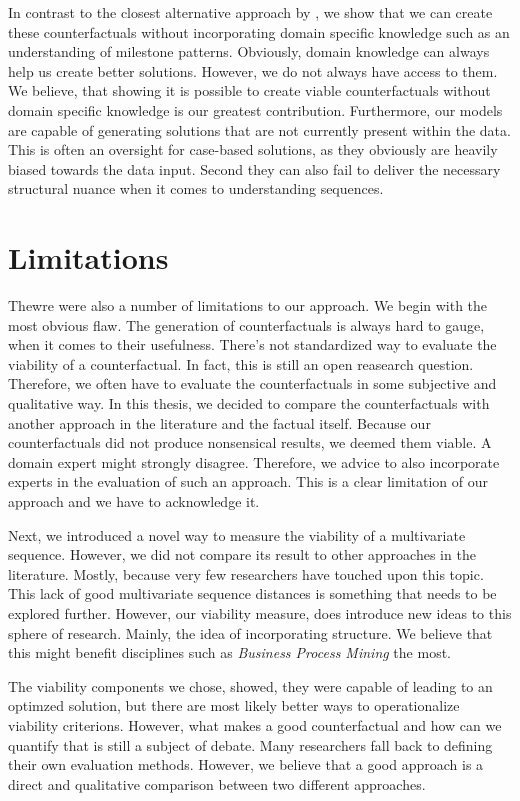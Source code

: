 \documentclass[12pt,a4paper]{report}
\begin{document}
In contrast to the closest alternative approach by \citeauthor{hsieh_DiCE4ELInterpretingProcess_2021}, we show that we can create these counterfactuals without incorporating domain specific knowledge such as an understanding of milestone patterns. Obviously, domain knowledge can always help us create better solutions. However, we do not always have access to them. We believe, that showing it is possible to create viable counterfactuals without domain specific knowledge is our greatest contribution. Furthermore, our models are capable of generating solutions that are not currently present within the data. This is often an oversight for case-based solutions, as they obviously are heavily biased towards the data input. Second they can also fail to deliver the necessary structural nuance when it comes to understanding sequences.

\section{Limitations}
Thewre were also a number of limitations to our approach. We begin with the most obvious flaw. The generation of counterfactuals is always hard to gauge, when it comes to their usefulness. There's not standardized way to evaluate the viability of a counterfactual. In fact, this is still an open reasearch question. Therefore, we often have to evaluate the counterfactuals in some subjective and qualitative way. In this thesis, we decided to compare the counterfactuals with another approach in the literature and the factual itself. Because our counterfactuals did not produce nonsensical results, we deemed them viable. A domain expert might strongly disagree. Therefore, we advice to also incorporate experts in the evaluation of such an approach. This is a clear limitation of our approach and we have to acknowledge it. 

Next, we introduced a novel way to measure the viability of a multivariate sequence. However, we did not compare its result to other approaches in the literature. Mostly, because very few researchers have touched upon this topic. This lack of good multivariate sequence distances is something that needs to be explored further. However, our viability measure, does introduce new ideas to this sphere of research. Mainly, the idea of incorporating structure. We believe that this might benefit disciplines such as \emph{Business Process Mining} the most. 

The viability components we chose, showed, they were capable of leading to an optimzed solution, but there are most likely better ways to operationalize viability criterions. However, what makes a good counterfactual and how can we quantify that is still a subject of debate. Many researchers fall back to defining their own evaluation methods. However, we believe that a good approach is a direct and qualitative comparison between two different approaches.
\end{document}
